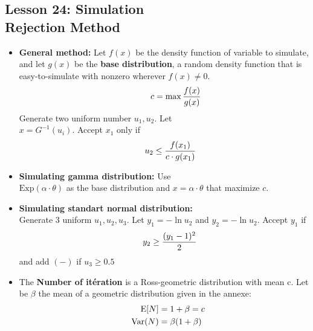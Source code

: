 \documentclass[10pt, french]{article}
\begin{document}
\begin{multicols*}{3}
\section*{Lesson 24: Simulation \\ Rejection Method}
\begin{itemize}[align=left,leftmargin=*]
    \item \textbf{General method:} Let $f(x)$ be the density function of variable to simulate, and let $g(x)$ be the \textbf{base distribution}, a random density function that is easy-to-simulate with nonzero wherever $f(x)\neq 0$. \[\hspace*{1cm} c = \max \frac{f(x)}{g(x)} \]
     Generate two uniform number $u_1, u_2$. Let \\ $x = G^{-1}(u_i)$. Accept $x_1$ only if \[\hspace*{.5cm} u_2 \leq \frac{f(x_1)}{c \cdot g(x_1)} \]
    \item \textbf{Simulating gamma distribution:} Use \\ $\mathrm{Exp}(\alpha \cdot \theta)$ as the base distribution and $x = \alpha \cdot \theta$ that maximize $c$. 
    \item \textbf{Simulating standart normal distribution:} \\ Generate 3 uniform $u_1, u_2, u_3$. Let $y_1 = -\ln u_2$ and $y_2 = -\ln u_2$. Accept $y_1$ if \[\hspace*{.5cm} y_2 \geq \frac{(y_1-1)^2}{2} \] and add $(-)$ if $u_3 \geq 0.5$
    \item  The \textbf{Number of itération} is a Ross-geometric distribution with mean c. Let be $\beta$ the mean of a geometric distribution given in the annexe:
    \begin{align*}
    \hspace*{.7cm}
        \mathrm{E} {\left[ N \right]} &= 1 + \beta = c \\
        \mathrm{Var} {\left( N \right)} &= \beta(1+\beta)
    \end{align*}
\end{itemize}

\def\SectionColor{red!80!white}

\end{multicols*}
\end{document}
